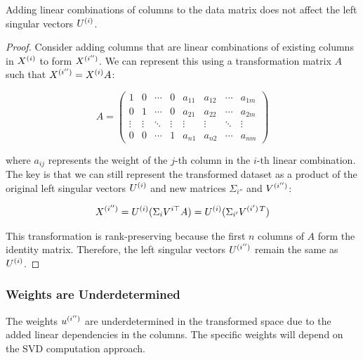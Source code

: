 \begin{lemma}
Adding linear combinations of columns to the data matrix does not affect the left singular vectors $U^{(i)}$.
\end{lemma}

\begin{proof}
    Consider adding columns that are linear combinations of existing columns in \( X^{(i)} \) to form \( X^{(i'')} \).
    We can represent this using a transformation matrix \( A \) such that \( X^{(i'')} = X^{(i)}A \):

    \begin{equation}
        A = \begin{pmatrix}
                1      & 0      & \cdots & 0      & a_{11} & a_{12} & \cdots & a_{1m} \\
                0      & 1      & \cdots & 0      & a_{21} & a_{22} & \cdots & a_{2m} \\
                \vdots & \vdots & \ddots & \vdots & \vdots & \vdots & \ddots & \vdots \\
                0      & 0      & \cdots & 1      & a_{n1} & a_{n2} & \cdots & a_{nm}
        \end{pmatrix}
    \end{equation}
    
    where \( a_{ij} \) represents the weight of the \( j \)-th column in the \( i \)-th linear combination. The key is that we can still represent the transformed dataset as a product of the original left singular vectors \( U^{(i)} \) and new matrices \( \Sigma_{i''} \) and \( V^{(i'')} \):
    
    \begin{align}
        X^{(i'')} = U^{(i)}(\Sigma_{i}V^{i\top}A) = U^{(i)}(\Sigma_{i'}V^{(i')\,T})  \label{eq:svd_linear_combinations}
    \end{align}
    
    This transformation is rank-preserving because the first \( n \) columns of \( A \) form the identity matrix. Therefore, the left singular vectors \( U^{(i'')} \) remain the same as \( U^{(i)} \).
\end{proof}

\subsubsection{Weights are Underdetermined}

The weights $u^{(i'')}$ are underdetermined in the transformed space due to the added linear dependencies in the columns. The specific weights will depend on the SVD computation approach.

